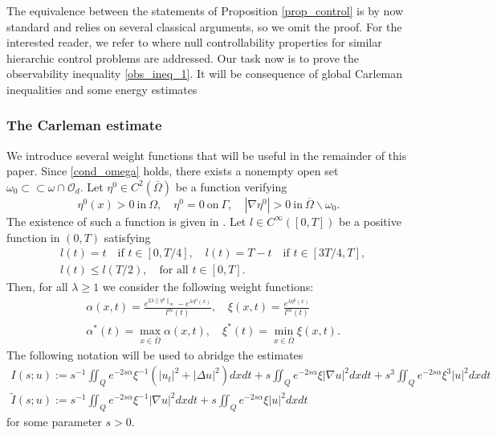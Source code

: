 \documentclass[preprint,10pt]{article}
\numberwithin{equation}{section}
\numberwithin{theorem}{section}
\begin{document}
{The equivalence between the statements of Proposition \ref{prop_control} is by now standard and relies on several classical arguments, so we omit the proof. For the interested reader, we refer to \cite{araruna,vhs_deT_rob} where null controllability properties for similar hierarchic control problems are addressed. Our task now is to prove the observability inequality \eqref{obs_ineq_1}. It will be consequence of global Carleman inequalities and some energy estimates

\subsubsection*{The Carleman estimate}

We introduce several weight functions that will be useful in the remainder of this paper. Since \eqref{cond_omega} holds, there exists a nonempty open set $\omega_0\subset\subset\omega\cap\mathcal O_d$. Let $\eta^0\in C^2(\overline\Omega)$ be a function verifying
%
\begin{equation}
\eta^0(x)>0 \ \text{in} \ \Omega, \quad \eta^0=0 \ \text{on} \ \Gamma, \quad |\nabla\eta^0|>0 \ \text{in} \ \overline{\Omega}\backslash\omega_0.
\end{equation}
%
The existence of such a function is given in \cite{fursi}. Let $l\in C^\infty([0,T])$ be a positive function in $(0,T)$ satisfying 
%
\begin{equation}
\begin{split}
&l(t)=t \quad \text{if } t\in [0,T/4], \quad l(t)=T-t \quad \text{if } t\in [3T/4,T], \\
&l(t)\leq l(T/2), \quad \text{for all } t\in[0,T]. 
\end{split}
\end{equation}
%
Then, for all $\lambda\geq 1$ we consider the following weight functions:
%
\begin{equation}\label{weights_l} 
\begin{split}
&\alpha(x,t)= \frac{e^{2\lambda\|\eta^0\|_\infty}-e^{\lambda\eta^0(x)}}{l^m(t)}, \quad \xi(x,t)=\frac{e^{\lambda \eta^0(x)}}{l^m(t)} \\
&\alpha^*(t)=\max_{x\in\overline{\Omega}}\alpha(x,t), \quad \xi^*(t)=\min_{x\in\overline\Omega} \xi(x,t).
\end{split}
\end{equation}
%
The following notation will be used to abridge the estimates
%
\begin{equation*} 
\begin{gathered}
I(s;u):=s^{-1}\iint_{Q}e^{-2s\alpha}\xi^{-1}(|u_t|^2+|\Delta u|^2)dxdt+s\iint_Qe^{-2s\alpha}\xi|\nabla u|^2dxdt+s^3\iint_Qe^{-2s\alpha}\xi^3|u|^2dxdt \\
\widetilde I(s;u):=s^{-1}\iint_{Q}e^{-2s\alpha}\xi^{-1}|\nabla u|^2dxdt+s\iint_{Q}e^{-2s\alpha}\xi |u|^2dxdt 
\end{gathered}
\end{equation*}
%
for some parameter $s>0$. 

}
\end{document}
